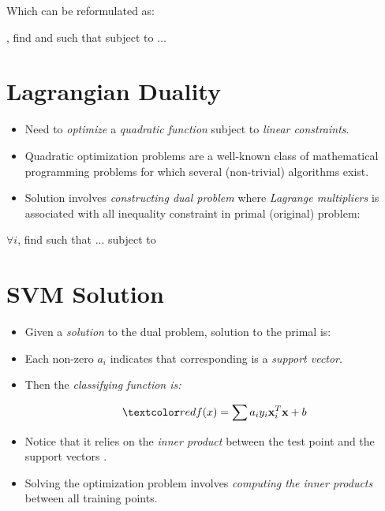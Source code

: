 \documentclass[
	number={2},
	title={Learning Linear Separators{,} SVMs and Kernels}
]{cs584notes}
\begin{document}
Which can be reformulated as:

\begin{svmbox}
	, find  and  such that
	\data{\[ \mbox{\emph{Minimize }} Q(w) = \frac{1}{2}||\vec{w}||^{2} = \frac{1}{2}\vec{w}^{T}\vec{w} \]}
	subject to \data{$~$} $\dots$ %
\end{svmbox}

\section{Lagrangian Duality}\label{sec:lagrangian-duality}
\begin{itemize}
	\item Need to \emph{optimize} a \emph{quadratic function} subject to \emph{linear constraints}.
	\item Quadratic optimization problems are a well-known class of mathematical programming problems for which several (non-trivial) algorithms exist.
	\item Solution involves \emph{constructing dual problem} where \emph{Lagrange multipliers}  is associated with all inequality constraint in primal (original) problem:
\end{itemize}

\begin{svmbox}
	$\forall i$, find  such that ... subject to 
\end{svmbox}

\section{SVM Solution}\label{sec:svm-solution}
\begin{itemize}
	\item Given a \emph{solution}  to the dual problem, solution to the primal is:
	\begin{svmbox}
		\data{\[ \vec{w} = \sum a_{i}y_{i}\vec{x}\ \ \ b = y_{k} - \sum a_{i}y_{i}\vec{x}_{i}^{T}\vec{x}_{k} \mbox{ for any } a_{k} > 0  \]}
	\end{svmbox}
	\item Each non-zero $a_{i}$ indicates that corresponding  is a \emph{support vector}.
	\item Then the \emph{classifying function is:}
	\begin{svmbox}
		\[ \data{ f(x) = \sum a_{i}y_{i}\vec{x}_{i}^{T}\vec{x} + b } \]
	\end{svmbox}
	\item Notice that it relies on the \emph{inner product} between the test point  and the support vectors .
	\item Solving the optimization problem involves \emph{computing the inner products}  between all training points.
\end{itemize}
\end{document}
